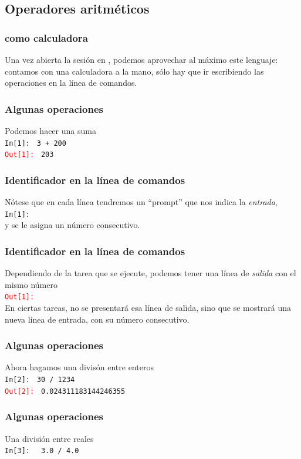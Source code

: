 \documentclass[12pt]{beamer}
\begin{document}
{\subsection{Operadores aritméticos}
\begin{frame}
\frametitle{\python{} como calculadora}
Una vez abierta la sesión en \python, podemos aprovechar al máximo este lenguaje: contamos con una calculadora a la mano, sólo hay que ir escribiendo las operaciones en la línea de comandos.
\end{frame}
\begin{frame}[fragile]
\frametitle{Algunas operaciones}
Podemos hacer una suma
\\
\bigskip
\textcolor{ao}{\texttt{In[1]: }} \verb|3 + 200| \\
\pause
\textcolor{red}{\texttt{Out[1]: }} \verb|203|
\end{frame}
\begin{frame}[fragile]
\frametitle{Identificador en la línea de comandos}
Nótese que en cada línea tendremos un \enquote{prompt} que nos indica la \emph{entrada}, 
\\
\bigskip
\textcolor{ao}{\texttt{In[1]: }}
\pause
\\
\bigskip
y se le asigna un número consecutivo.
\end{frame}
\begin{frame}[fragile]
\frametitle{Identificador en la línea de comandos}
Dependiendo de la tarea que se ejecute, podemos tener una línea de \emph{salida} con el mismo número
\\
\bigskip
\textcolor{red}{\texttt{Out[1]: }}
\\
\bigskip
\pause
En ciertas tareas, no se presentará esa línea de salida, sino que se mostrará una nueva línea de entrada, con su número consecutivo.
\end{frame}
\begin{frame}[fragile]
\frametitle{Algunas operaciones}
Ahora hagamos una divisón entre enteros
\\
\bigskip
\textcolor{ao}{\texttt{In[2]: }} \verb|30 / 1234| \\
\pause
\textcolor{red}{\texttt{Out[2]: }} \verb|0.024311183144246355|
\end{frame}
\begin{frame}[fragile]
\frametitle{Algunas operaciones}
Una división entre reales
\\
\bigskip
\textcolor{ao}{\texttt{In[3]: }} \verb| 3.0 / 4.0| \\

\end{frame}}
\end{document}
